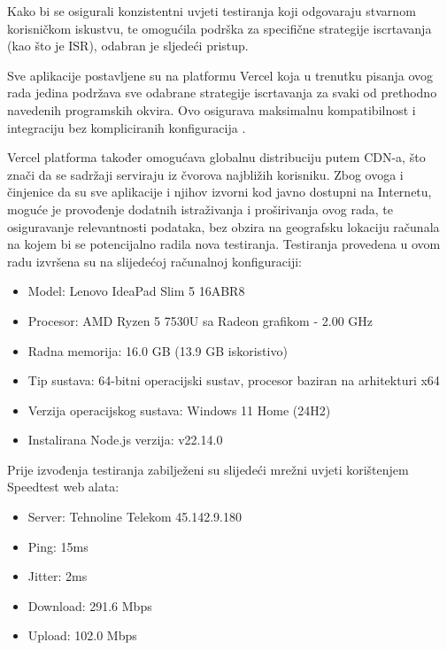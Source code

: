 Kako bi se osigurali konzistentni uvjeti testiranja koji odgovaraju stvarnom korisničkom iskustvu, te omogućila podrška za specifične strategije iscrtavanja (kao što je ISR), odabran je sljedeći pristup.

\bigskip

Sve aplikacije postavljene su na platformu Vercel koja u trenutku pisanja ovog rada jedina podržava sve odabrane strategije iscrtavanja za svaki od prethodno navedenih programskih okvira. Ovo osigurava maksimalnu kompatibilnost i integraciju bez kompliciranih konfiguracija \cite{vercelframeworks}.

\bigskip

Vercel platforma također omogućava globalnu distribuciju putem CDN-a, što znači da se sadržaji serviraju iz čvorova najbližih korisniku. Zbog ovoga i činjenice da su sve aplikacije i njihov izvorni kod javno dostupni na Internetu, moguće je provođenje dodatnih istraživanja i proširivanja ovog rada, te osiguravanje relevantnosti podataka, bez obzira na geografsku lokaciju računala na kojem bi se potencijalno radila nova testiranja.
Testiranja provedena u ovom radu izvršena su na slijedećoj računalnoj konfiguraciji:

\bigskip

\begin{itemize}
    \item Model: Lenovo IdeaPad Slim 5 16ABR8
    \item Procesor: AMD Ryzen 5 7530U sa Radeon grafikom - 2.00 GHz
    \item Radna memorija: 16.0 GB (13.9 GB iskoristivo)
    \item Tip sustava: 64-bitni operacijski sustav, procesor baziran na arhitekturi x64
    \item Verzija operacijskog sustava: Windows 11 Home (24H2)
    \item Instalirana Node.js verzija: v22.14.0
\end{itemize}

Prije izvođenja testiranja zabilježeni su slijedeći mrežni uvjeti korištenjem Speedtest web alata:

\begin{itemize}
    \item Server: Tehnoline Telekom 45.142.9.180
    \item Ping: 15ms
    \item Jitter: 2ms
    \item Download: 291.6 Mbps
    \item Upload: 102.0 Mbps
\end{itemize}
